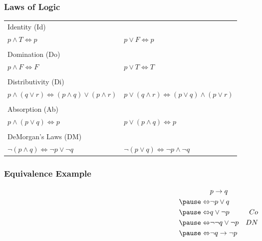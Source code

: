 \documentclass[dvipsnames]{beamer}
\begin{document}
\begin{frame}
  \frametitle{Laws of Logic}

  \begin{tabular}{ll}
  \alert{Identity (Id)} &\\
    $p \wedge T \Leftrightarrow p$ &
    $p \vee F \Leftrightarrow p$\\\\
  \pause
  \alert{Domination (Do)} &\\
    $p \wedge F \Leftrightarrow F$ &
    $p \vee T \Leftrightarrow T$\\\\
  \pause
  \alert{Distributivity (Di)} &\\
    $p \wedge (q \vee r) \Leftrightarrow (p \wedge q) \vee (p \wedge r)$ &
    $p \vee (q \wedge r) \Leftrightarrow (p \vee q) \wedge (p \vee r)$\\\\
  \pause
  \alert{Absorption (Ab)} &\\
    $p \wedge (p \vee q) \Leftrightarrow p$ &
    $p \vee (p \wedge q) \Leftrightarrow p$\\\\
  \pause
  \alert{DeMorgan's Laws (DM)} &\\
    $\neg (p \wedge q) \Leftrightarrow \neg p \vee \neg q$ &
    $\neg (p \vee q) \Leftrightarrow \neg p \wedge \neg q$
  \end{tabular}
\end{frame}

\begin{frame}
  \frametitle{Equivalence Example}

  \begin{eqnarray*}
                    & p \rightarrow q           &   \\
    \pause
    \Leftrightarrow & \neg p \vee q             &   \\
    \pause
    \Leftrightarrow & q \vee \neg p             & Co\\
    \pause
    \Leftrightarrow & \neg \neg q \vee \neg p   & DN\\
    \pause
    \Leftrightarrow & \neg q \rightarrow \neg p &
  \end{eqnarray*}
\end{frame}
\end{document}
